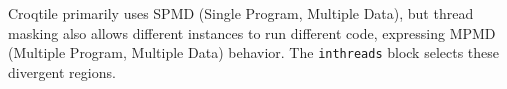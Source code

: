 Croqtile primarily uses SPMD (Single Program, Multiple Data), but thread masking also allows different instances to run different code, expressing MPMD (Multiple Program, Multiple Data) behavior. The \texttt{inthreads} block selects these divergent regions.
